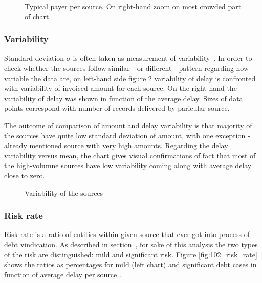 \documentclass{article}
\begin{document}
\begin{figure}[htbp!]
    \begin{center}
        
    \caption{Typical payer per source. On right-hand zoom on most crowded part of chart}
    \label{fig:101_typical_payer}
    \end{center}
\end{figure}

\subsubsection{Variability}

Standard deviation $\sigma$ is often taken as measurement of variability\ \cite{the-art}.
In order to check whether the sources follow similar - or different - pattern regarding how variable the data are,
on left-hand side figure \ref{fig:102_variability} variability of delay is confronted with variability of
invoiced amount for each source.
On the right-hand the variability of delay was shown in function of the average delay.
Sizes of data points correspond with number of records delivered by paricular source.
\par
The outcome of comparison of amount and delay variability is that majority of the sources have quite low standard
deviation of amount, with one exception - already mentioned source with very high amounts.
Regarding the delay variability versus mean, the chart gives visual confirmations of fact that most of the high-volumne
sources have low variability coming along with average delay close to zero.

\begin{figure}[htbp!]
    \begin{center}
        
    \caption{Variability of the sources}
    \label{fig:102_variability}
    \end{center}
\end{figure}

\subsubsection{Risk rate}

Risk rate is a ratio of entities within given source that ever got into process of debt vindication.
As described in section\ , for sake of this analysis the two types of the risk are distinguished: mild and significant risk.
Figure \ref{fig:102_risk_rate} shows the ratios as percentages for mild (left chart) and significant debt cases in function of average delay per source .
\end{document}
